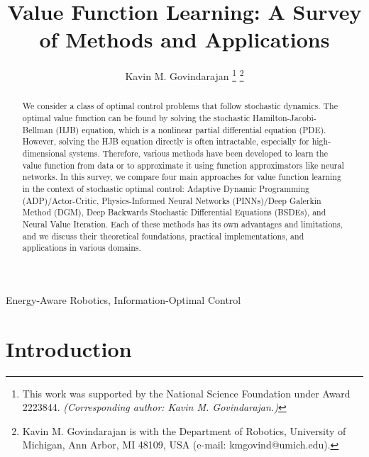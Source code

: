 \documentclass[journal, twoside]{IEEEtran}
\theoremstyle{remark}
\begin{document}
\title{Value Function Learning: A Survey of Methods and Applications}
\author{Kavin M. Govindarajan%
\thanks{This work was supported by the National Science Foundation under Award 2223844. \textit{(Corresponding author: Kavin M. Govindarajan.)}}
\thanks{Kavin M. Govindarajan is with the Department of Robotics, University of Michigan, Ann Arbor, MI 48109, USA (e-mail: kmgovind@umich.edu).}%
}



\maketitle

\begin{abstract}
We consider a class of optimal control problems that follow stochastic dynamics. The optimal value function can be found by solving the stochastic Hamilton-Jacobi-Bellman (HJB) equation, which is a nonlinear partial differential equation (PDE). However, solving the HJB equation directly is often intractable, especially for high-dimensional systems. Therefore, various methods have been developed to learn the value function from data or to approximate it using function approximators like neural networks. In this survey, we compare four main approaches for value function learning in the context of stochastic optimal control: Adaptive Dynamic Programming (ADP)/Actor-Critic, Physics-Informed Neural Networks (PINNs)/Deep Galerkin Method (DGM), Deep Backwards Stochastic Differential Equations (BSDEs), and Neural Value Iteration. Each of these methods has its own advantages and limitations, and we discuss their theoretical foundations, practical implementations, and applications in various domains.
\end{abstract}

\begin{IEEEkeywords}
Energy-Aware Robotics, Information-Optimal Control
\end{IEEEkeywords}

\section{Introduction}\label{sec:intro}

\end{document}
